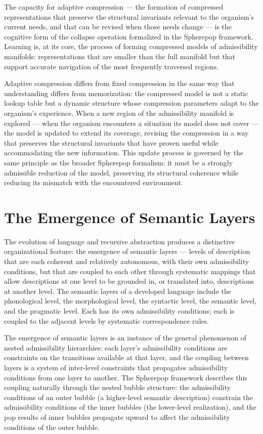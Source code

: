 \documentclass[12pt,openany]{book}
\theoremstyle{plain}
\theoremstyle{definition}
\theoremstyle{remark}
\begin{document}
The capacity for adaptive compression — the formation of compressed representations that preserve the structural invariants relevant to the organism's current needs, and that can be revised when those needs change — is the cognitive form of the collapse operation formalized in the Spherepop framework. Learning is, at its core, the process of forming compressed models of admissibility manifolds: representations that are smaller than the full manifold but that support accurate navigation of the most frequently traversed regions.

Adaptive compression differs from fixed compression in the same way that understanding differs from memorization: the compressed model is not a static lookup table but a dynamic structure whose compression parameters adapt to the organism's experience. When a new region of the admissibility manifold is explored — when the organism encounters a situation its model does not cover — the model is updated to extend its coverage, revising the compression in a way that preserves the structural invariants that have proven useful while accommodating the new information. This update process is governed by the same principle as the broader Spherepop formalism: it must be a strongly admissible reduction of the model, preserving its structural coherence while reducing its mismatch with the encountered environment.

\section{The Emergence of Semantic Layers}

The evolution of language and recursive abstraction produces a distinctive organizational feature: the emergence of semantic layers — levels of description that are each coherent and relatively autonomous, with their own admissibility conditions, but that are coupled to each other through systematic mappings that allow descriptions at one level to be grounded in, or translated into, descriptions at another level. The semantic layers of a developed language include the phonological level, the morphological level, the syntactic level, the semantic level, and the pragmatic level. Each has its own admissibility conditions; each is coupled to the adjacent levels by systematic correspondence rules.

The emergence of semantic layers is an instance of the general phenomenon of nested admissibility hierarchies: each layer's admissibility conditions are constraints on the transitions available at that layer, and the coupling between layers is a system of inter-level constraints that propagates admissibility conditions from one layer to another. The Spherepop framework describes this coupling naturally through the nested bubble structure: the admissibility conditions of an outer bubble (a higher-level semantic description) constrain the admissibility conditions of the inner bubbles (the lower-level realization), and the pop results of inner bubbles propagate upward to affect the admissibility conditions of the outer bubble.
\end{document}

